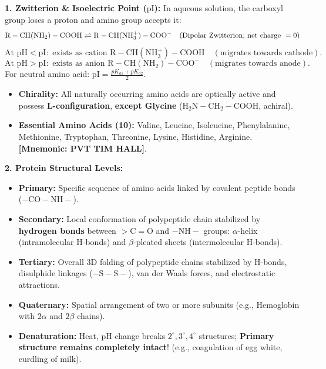 \documentclass[10pt,a4paper]{article}
\begin{document}
\begin{formulabox}
\textbf{1. Zwitterion \& Isoelectric Point ($\mathrm{pI}$):}
In aqueous solution, the carboxyl group loses a proton and amino group accepts it:
\begin{equation}
  \mathrm{R-CH(NH_2)-COOH} \xrightleftharpoons{} \mathrm{R-CH(NH_3^+)-COO^-} \quad (\text{Dipolar Zwitterion; net charge } = 0)
\end{equation}
\begin{equation}
  \text{At } \mathrm{pH} < \mathrm{pI}: \text{ exists as cation } \mathrm{R-CH(NH_3^+)-COOH} \quad (\text{migrates towards cathode}).
\end{equation}
\begin{equation}
  \text{At } \mathrm{pH} > \mathrm{pI}: \text{ exists as anion } \mathrm{R-CH(NH_2)-COO^-} \quad (\text{migrates towards anode}).
\end{equation}
For neutral amino acid: $\mathrm{pI} = \frac{pK_{a1} + pK_{a2}}{2}$.
\begin{itemize}
  \item \textbf{Chirality:} All naturally occurring amino acids are optically active and possess \textbf{L-configuration}, \textbf{except Glycine} ($\mathrm{H_2N-CH_2-COOH}$, achiral).
  \item \textbf{Essential Amino Acids (10):} Valine, Leucine, Isoleucine, Phenylalanine, Methionine, Tryptophan, Threonine, Lysine, Histidine, Arginine. \textbf{[Mnemonic: PVT TIM HALL]}.
\end{itemize}
\textbf{2. Protein Structural Levels:}
\begin{itemize}
  \item \textbf{Primary:} Specific sequence of amino acids linked by covalent peptide bonds ($-\mathrm{CO-NH}-$).
  \item \textbf{Secondary:} Local conformation of polypeptide chain stabilized by \textbf{hydrogen bonds} between $>\mathrm{C=O}$ and $-\mathrm{NH}-$ groups: $\alpha$-helix (intramolecular H-bonds) and $\beta$-pleated sheets (intermolecular H-bonds).
  \item \textbf{Tertiary:} Overall 3D folding of polypeptide chains stabilized by H-bonds, disulphide linkages ($-\mathrm{S-S}-$), van der Waals forces, and electrostatic attractions.
  \item \textbf{Quaternary:} Spatial arrangement of two or more subunits (e.g., Hemoglobin with $2\alpha$ and $2\beta$ chains).
  \item \textbf{Denaturation:} Heat, pH change breaks $2^\circ, 3^\circ, 4^\circ$ structures; \textbf{Primary structure remains completely intact}! (e.g., coagulation of egg white, curdling of milk).
\end{itemize}
\end{formulabox}
\end{document}
